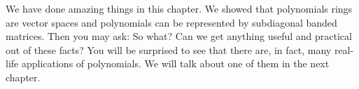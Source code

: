 We have done amazing things in this chapter. We showed that polynomials rings are vector spaces and polynomials can be represented by subdiagonal banded matrices. Then you may ask: So what? Can we get anything useful and practical out of these facts? You will be surprised to see that there are, in fact, many real-life applications of polynomials. We will talk about one of them in the next chapter.
